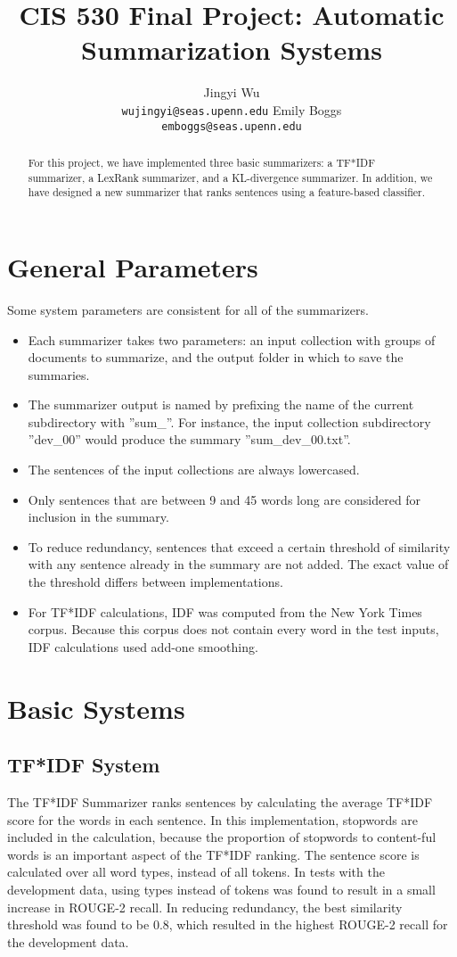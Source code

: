 \documentclass[11pt,letterpaper]{article}
\title{CIS 530 Final Project: Automatic Summarization Systems}
\author{Jingyi Wu \\
	    {\tt wujingyi@seas.upenn.edu}
	  \And
    Emily Boggs\\
  {\tt emboggs@seas.upenn.edu}}
\begin{document}
\maketitle
\begin{abstract}
For this project, we have implemented three basic summarizers: a TF*IDF summarizer, a LexRank summarizer, and a KL-divergence summarizer. In addition, we have designed a new summarizer that ranks sentences using a feature-based classifier.
\end{abstract}

\section{General Parameters}
Some system parameters are consistent for all of the summarizers. 
\begin{itemize}
\item Each summarizer takes two parameters: an input collection with groups of documents to summarize, and the output folder in which to save the summaries.
\item The summarizer output is named by prefixing the name of the current subdirectory with ''sum\_''. For instance, the input collection subdirectory ''dev\_00'' would produce the summary ''sum\_dev\_00.txt''.
\item The sentences of the input collections are always lowercased. 
\item Only sentences that are between 9 and 45 words long are considered for inclusion in the summary.
\item To reduce redundancy, sentences that exceed a certain threshold of similarity with any sentence already in the summary are not added. The exact value of the threshold differs between implementations.
\item For TF*IDF calculations, IDF was computed from the New York Times corpus. Because this corpus does not contain every word in the test inputs, IDF calculations used add-one smoothing.
\end{itemize}

\section{Basic Systems}

\subsection{TF*IDF System}
The TF*IDF Summarizer ranks sentences by calculating the average TF*IDF score for the words in each sentence. In this implementation, stopwords are included in the calculation, because the proportion of stopwords to content-ful words is an important aspect of the TF*IDF ranking.
The sentence score is calculated over all word types, instead of all tokens. In tests with the development data, using types instead of tokens was found to result in a small increase in ROUGE-2 recall.
In reducing redundancy, the best similarity threshold was found to be 0.8, which resulted in the highest ROUGE-2 recall for the development data. 
\end{document}

